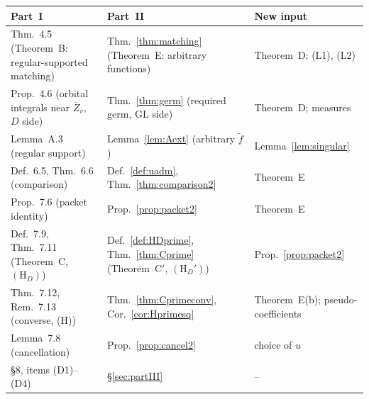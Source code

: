 \documentclass[12pt]{article}
\newcommand{\ov}[1]{\overline{#1}}
\newcommand{\GL}{\mathrm{GL}}
\newcommand{\Zb}{\ov{Z}}
\theoremstyle{plain}
\theoremstyle{definition}
\begin{document}
\begin{center}
\begin{tabular}{>{\raggedright\arraybackslash}p{}>{\raggedright\arraybackslash}p{}>{\raggedright\arraybackslash}p{}}
\toprule
Part~I & Part~II & New input\\
\midrule
Thm.~4.5 (Theorem~B: regular-supported matching) & Thm.~\ref{thm:matching} (Theorem~E: arbitrary functions) & Theorem~D; (L1), (L2)\\
Prop.~4.6 (orbital integrals near $\Zb_v$, $D$ side) & Thm.~\ref{thm:germ} (required germ, $\GL$ side) & Theorem~D; measures\\
Lemma~A.3 (regular support) & Lemma~\ref{lem:Aext} (arbitrary $\tilde f$) & Lemma~\ref{lem:singular}\\
Def.~6.5, Thm.~6.6 (comparison) & Def.~\ref{def:uadm}, Thm.~\ref{thm:comparison2} & Theorem~E\\
Prop.~7.6 (packet identity) & Prop.~\ref{prop:packet2} & Theorem~E\\
Def.~7.9, Thm.~7.11 (Theorem~C, $(\mathrm H_D)$) & Def.~\ref{def:HDprime}, Thm.~\ref{thm:Cprime} (Theorem~C$'$, $(\mathrm H_D')$) & Prop.~\ref{prop:packet2}\\
Thm.~7.12, Rem.~7.13 (converse, (H)) & Thm.~\ref{thm:Cprimeconv}, Cor.~\ref{cor:Hprimesq} & Theorem~E(b); pseudo-coefficients\\
Lemma~7.8 (cancellation) & Prop.~\ref{prop:cancel2} & choice of $u$\\
\S8, items (D1)--(D4) & \S\ref{sec:partIII} & --\\
\bottomrule
\end{tabular}
\end{center}
\end{document}
